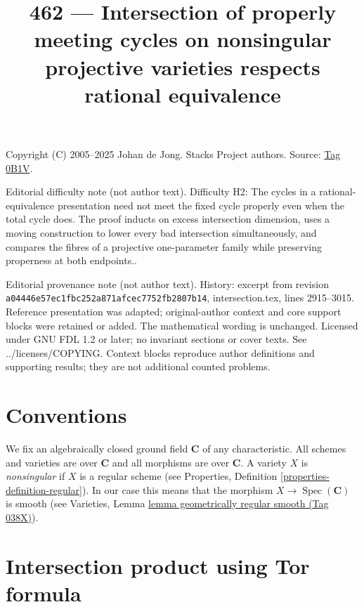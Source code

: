 \documentclass{amsart}
\theoremstyle{plain}
\theoremstyle{definition}
\theoremstyle{remark}
\numberwithin{equation}{subsection}
\def\Spec{\mathop{\mathrm{Spec}}}
\begin{document}
\title[Stacks Project, Tag 0B1V]{462 --- Intersection of properly meeting cycles on nonsingular projective varieties respects rational equivalence}
\maketitle
\noindent Copyright (C) 2005--2025 Johan de Jong. Stacks Project authors. Source: \href{https://stacks.math.columbia.edu/tag/0B1V}{Tag 0B1V}.

\noindent Editorial difficulty note (not author text). Difficulty H2: The cycles in a rational-equivalence presentation need not meet the fixed cycle properly even when the total cycle does. The proof inducts on excess intersection dimension, uses a moving construction to lower every bad intersection simultaneously, and compares the fibres of a projective one-parameter family while preserving properness at both endpoints..

\noindent Editorial provenance note (not author text). History: excerpt from revision \texttt{a0444\allowbreak 6e57e\allowbreak c1fbc\allowbreak 252a8\allowbreak 71afc\allowbreak ec775\allowbreak 2fb28\allowbreak 07b14}, intersection.tex, lines 2915--3015. Reference presentation was adapted; original-author context and core support blocks were retained or added. The mathematical wording is unchanged. Licensed under GNU FDL 1.2 or later; no invariant sections or cover texts. See ../licenses/COPYING. Context blocks reproduce author definitions and supporting results; they are not additional counted problems.

\section{Conventions}
\label{section-conventions}

\noindent
We fix an algebraically closed ground field $\mathbf{C}$ of any
characteristic. All schemes and varieties are over $\mathbf{C}$ and all
morphisms are over $\mathbf{C}$. A variety $X$ is
{\it nonsingular} if $X$ is a regular scheme (see
Properties, Definition \ref{properties-definition-regular}).
In our case this means that the morphism $X \to \Spec(\mathbf{C})$
is smooth (see
Varieties, Lemma \href{https://stacks.math.columbia.edu/tag/038X}{lemma geometrically regular smooth (Tag 038X)}).




\section{Intersection product using Tor formula}
\label{section-intersection-product}
\end{document}
